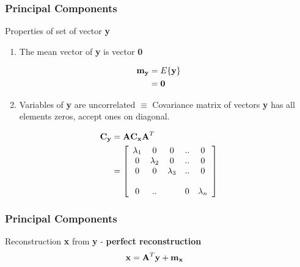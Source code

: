 \documentclass[english,11pt,table,handout]{beamer}
\begin{document}
\frame
{
	\frametitle{Principal Components}
	\large

	\begin{alertblock}{Properties of set of vector \textbf{y}}
		\begin{enumerate}
			\setcounter{enumi}{0}
			\item The mean vector of \textbf{y} is vector \textbf{0}
		\end{enumerate}
		\begin{equation}
		\nonumber
		\begin{split}
		\text{\textbf{m}}_\text{\textbf{y}}
		&= E\{\text{\textbf{y}}\} \\
		&= \text{\textbf{0}}
		\end{split}
		\end{equation}
		
		\begin{enumerate}
			\setcounter{enumi}{1}
			\item Variables of \textbf{y} are uncorrelated $\equiv$ Covariance matrix of vectors \textbf{y} has all elements zeros, accept ones on diagonal.
		\end{enumerate}
		\begin{equation}
		\nonumber
		\begin{split}
		\text{\textbf{C}}_\text{\textbf{y}}
		&=  \text{\textbf{A}} \text{\textbf{C}}_\text{\textbf{x}}\text{\textbf{A}}^T \\
		&= \left[
		\begin{array}{ccccc}
			\lambda_1 & 0 & 0 &.. & 0\\
			0 & \lambda_2 & 0 & .. & 0\\
			0 & 0 & \lambda_3 & .. & 0\\
			&&&&\\
			0 & .. &  & 0& \lambda_n
		\end{array}
		\right]
		\end{split}
		\end{equation}
		
	\end{alertblock}
}

\frame
{
	\frametitle{Principal Components}
	\large	
	\begin{block}{Reconstruction \textbf{x} from \textbf{y} - \alert{\textbf{perfect reconstruction}} }
		\begin{equation}
		\nonumber
		\begin{split}
		\text{\textbf{x}} 
		&= \text{\textbf{A}}^T\text{\textbf{y}} + \text{\textbf{m}}_\text{\textbf{x}}
		\end{split}
		\end{equation}
	\end{block}
}
\end{document}
